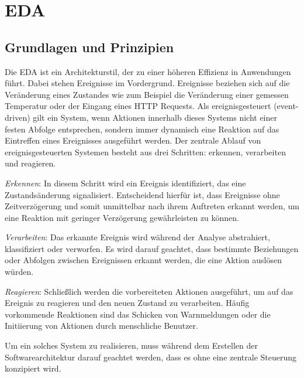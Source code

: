 \documentclass[a4paper,12pt]{article}
\let\stdsection\section
\renewcommand\section{\newpage\stdsection}
\begin{document}
\section{\ac{EDA}}
\subsection{Grundlagen und Prinzipien}
Die \ac{EDA} ist ein Architekturstil, der zu einer höheren Effizienz in Anwendungen führt. Dabei stehen Ereignisse im Vordergrund. Ereignisse beziehen sich auf die Veränderung eines Zustandes wie zum Beispiel die Veränderung einer gemessen Temperatur oder der Eingang eines HTTP Requests.
Als ereignisgesteuert (event-driven) gilt ein System, wenn Aktionen innerhalb dieses Systems nicht einer festen Abfolge entsprechen, sondern immer dynamisch eine Reaktion auf das Eintreffen eines Ereignisses ausgeführt werden.
Der zentrale Ablauf von ereignisgesteuerten Systemen besteht aus drei Schritten: erkennen, verarbeiten und reagieren. \cite[S. 48f]{Bruns2010}

\textit{Erkennen}: In diesem Schritt wird ein Ereignis identifiziert, das eine Zustandsänderung signalisiert. Entscheidend hierfür ist, dass Ereignisse ohne Zeitverzögerung und somit unmittelbar nach ihrem Auftreten erkannt werden, um eine Reaktion mit geringer Verzögerung gewährleisten zu können.

\textit{Verarbeiten}: Das erkannte Ereignis wird während der Analyse abstrahiert, klassifiziert oder verworfen. Es wird darauf geachtet, dass bestimmte Beziehungen oder Abfolgen zwischen Ereignissen erkannt werden, die eine Aktion auslösen würden.

\textit{Reagieren}: Schließlich werden die vorbereiteten Aktionen ausgeführt, um auf das Ereignis zu reagieren und den neuen Zustand zu verarbeiten. Häufig vorkommende Reaktionen sind das Schicken von Warnmeldungen oder die Initiierung von Aktionen durch menschliche Benutzer. 

Um ein solches System zu realisieren, muss während dem Erstellen der Softwarearchitektur darauf geachtet werden, dass es ohne eine zentrale Steuerung konzipiert wird. \cite[S. 50]{Bruns2010}
\end{document}
